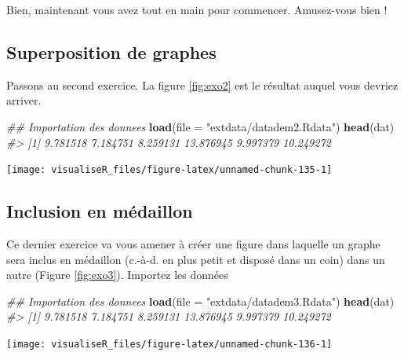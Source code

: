 \documentclass[]{article}
\newenvironment{Shaded}{\begin{snugshade}}{\end{snugshade}}
\newcommand{\CommentTok}[1]{\textcolor[rgb]{0.56,0.35,0.01}{\textit{#1}}}
\newcommand{\DataTypeTok}[1]{\textcolor[rgb]{0.13,0.29,0.53}{#1}}
\newcommand{\KeywordTok}[1]{\textcolor[rgb]{0.13,0.29,0.53}{\textbf{#1}}}
\newcommand{\NormalTok}[1]{#1}
\newcommand{\StringTok}[1]{\textcolor[rgb]{0.31,0.60,0.02}{#1}}
\begin{document}
Bien, maintenant vous avez tout en main pour commencer. Amusez-vous bien !

\hypertarget{superposition-de-graphes}{%
\subsection{Superposition de graphes}\label{superposition-de-graphes}}

Passons au second exercice. La figure \ref{fig:exo2} est le résultat auquel vous devriez arriver.

\begin{Shaded}
\begin{Highlighting}[]
\CommentTok{## Importation des donnees}
\KeywordTok{load}\NormalTok{(}\DataTypeTok{file =} \StringTok{"extdata/datadem2.Rdata"}\NormalTok{)}
\KeywordTok{head}\NormalTok{(dat)}
\CommentTok{#> [1]  9.781518  7.184751  8.259131 13.876945  9.997379 10.249272}
\end{Highlighting}
\end{Shaded}

\begin{center}\texttt{[image: visualiseR\_files/figure-latex/unnamed-chunk-135-1]} \end{center}

\hypertarget{inclusion-en-muxe9daillon}{%
\subsection{Inclusion en médaillon}\label{inclusion-en-muxe9daillon}}

Ce dernier exercice va vous amener à créer une figure dans laquelle un graphe sera inclus en médaillon (c.-à-d. en plus petit et disposé dans un coin) dans un autre (Figure \ref{fig:exo3}). Importez les données

\begin{Shaded}
\begin{Highlighting}[]
\CommentTok{## Importation des donnees}
\KeywordTok{load}\NormalTok{(}\DataTypeTok{file =} \StringTok{"extdata/datadem3.Rdata"}\NormalTok{)}
\KeywordTok{head}\NormalTok{(dat)}
\CommentTok{#> [1]  9.781518  7.184751  8.259131 13.876945  9.997379 10.249272}
\end{Highlighting}
\end{Shaded}

\begin{center}\texttt{[image: visualiseR\_files/figure-latex/unnamed-chunk-136-1]} \end{center}
\end{document}
